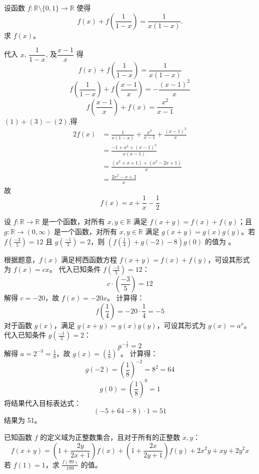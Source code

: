 \begin{questions}
    \question 设函数 \( f:\mathbb{R}\setminus\{0,1\} \to \mathbb{R} \) 使得
    \[
    f(x) + f\left(\frac{1}{1-x}\right) = \frac{1}{x(1-x)}.
    \]
    求 $f(x)$。
    \begin{solution}
        代入 \( x \), \( \dfrac{1}{1-x} \), 及\( \dfrac{x-1}{x} \) 得
        \[
        f(x) + f\left(\frac{1}{1-x}\right) = \frac{1}{x(1-x)} \tag{1} 
        \]
        \[
        f\left(\frac{1}{1-x}\right) + f\left(\frac{x-1}{x}\right) = -\frac{(x-1)^2}{x}\tag{2}
        \]
        \[
        f\left(\frac{x-1}{x}\right) + f(x) = \frac{x^2}{x-1} \tag{3}
        \]
        $(1)+(3)-(2)$,得
        \begin{align*}
        2f(x) &= \frac{1}{x(1-x)}+\frac{x^2}{x-1}+\frac{(x-1)^2}{x}\\
        &=\frac{-1+x^3+(x-1)^3}{x(x-1)}\\
        &=\frac{(x^2+x+1)+(x^2-2x+1)}{x}\\
        &=\frac{2x^2-x+2}{x}
        \end{align*}
        故
        \[
        f(x)=x+\frac1x-\frac12
        \]
    \end{solution}

\question 设 $f : \mathbb{R} \to \mathbb{R}$ 是一个函数，对所有 $x, y \in \mathbb{R}$ 满足 $f(x + y) = f(x) + f(y)$；且 $g : \mathbb{R} \to (0, \infty)$ 是一个函数，对所有 $x, y \in \mathbb{R}$ 满足 $g(x + y) = g(x)g(y)$。若 $f\left(\frac{-3}{5}\right) = 12$ 且 $g\left(\frac{-1}{3}\right) = 2$，则 $\left( f\left(\frac{1}{4}\right) + g(-2) - 8 \right) g(0)$ 的值为 \underline{\hspace{2cm}}。

\begin{solution}
根据题意，$f(x)$ 满足柯西函数方程 $f(x+y) = f(x) + f(y)$，可设其形式为 $f(x) = cx$。
代入已知条件 $f\left(\frac{-3}{5}\right) = 12$：
\[
c \cdot \left( \frac{-3}{5} \right) = 12
\]
解得 $c = -20$，故 $f(x) = -20x$。
计算得：
\[
f\left( \frac{1}{4} \right) = -20 \cdot \frac{1}{4} = -5
\]
对于函数 $g(x)$，满足 $g(x+y) = g(x)g(y)$，可设其形式为 $g(x) = a^x$。
代入已知条件 $g\left(\frac{-1}{3}\right) = 2$：
\[
a^{-\frac{1}{3}} = 2
\]
解得 $a = 2^{-3} = \frac{1}{8}$，故 $g(x) = \left( \frac{1}{8} \right)^x$。
计算得：
\[
g(-2) = \left( \frac{1}{8} \right)^{-2} = 8^2 = 64
\]
\[
g(0) = \left( \frac{1}{8} \right)^0 = 1
\]
将结果代入目标表达式：
\[
\left( -5 + 64 - 8 \right) \cdot 1 = 51
\]
结果为 51。
\end{solution}

\question
已知函数 $f$ 的定义域为正整数集合，且对于所有的正整数 $x, y$：
\[ f(x + y) = \left( 1 + \frac{2y}{2x + 1} \right) f(x) + \left( 1 + \frac{2x}{2y + 1} \right) f(y) + 2x^2 y + xy + 2y^2 x \]
若 $f(1) = 1$，求 $\frac{f(99)}{199}$ 的值。


\end{questions}
